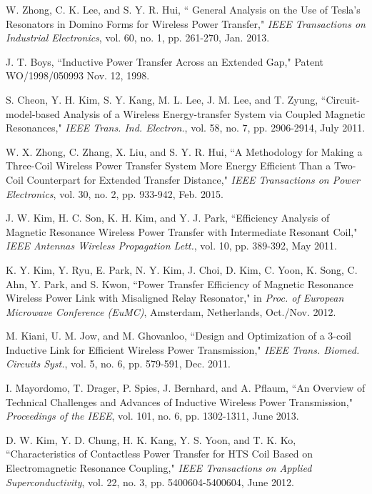 \documentclass[twocolumn,10pt]{IEEEtran}
\begin{document}
\begin{thebibliography}{99}
   W. Zhong, C. K. Lee, and S. Y. R. Hui, ``
 General Analysis on the Use of Tesla's Resonators in Domino Forms for Wireless Power Transfer," \emph{IEEE Transactions on Industrial Electronics}, vol. 60, no. 1, pp. 261-270, Jan. 2013.
 
 J. T. Boys, ``Inductive Power Transfer Across an Extended Gap," Patent WO/1998/050993 Nov. 12, 1998.
 
 S. Cheon, Y. H. Kim, S. Y. Kang, M. L. Lee, J. M. Lee, and T. Zyung, ``Circuit-model-based Analysis of a Wireless Energy-transfer System via Coupled Magnetic Resonances," \emph{IEEE Trans. Ind. Electron.}, vol. 58, no. 7, pp. 2906-2914, July 2011.
 
 W. X. Zhong, C. Zhang, X. Liu, and S. Y. R. Hui, 
``A Methodology for Making a Three-Coil Wireless Power Transfer System More Energy Efficient Than a Two-Coil Counterpart for Extended Transfer Distance,"
\emph{IEEE Transactions on Power Electronics}, 
vol. 30, no. 2, pp. 933-942, Feb. 2015. 

 J. W. Kim, H. C. Son, K. H. Kim, and Y. J. Park, ``Efficiency Analysis of Magnetic Resonance Wireless Power Transfer with Intermediate Resonant Coil," \emph{IEEE Antennas Wireless Propagation Lett.}, vol. 10, pp. 389-392,  May 2011. 
 
 K. Y. Kim, Y. Ryu, E. Park, N. Y. Kim, J. Choi, D. Kim, C. Yoon, K. Song, C. Ahn, Y. Park, and S. Kwon, ``Power Transfer Efficiency of Magnetic Resonance Wireless Power Link with Misaligned Relay Resonator," 
in \emph{Proc. of European Microwave Conference (EuMC)}, Amsterdam, Netherlands, Oct./Nov. 2012.

 M. Kiani, U. M. Jow, and M. Ghovanloo, ``Design and Optimization of a 3-coil Inductive Link for Efficient Wireless Power Transmission," \emph{IEEE Trans. Biomed. Circuits Syst.}, vol. 5, no. 6, pp. 579-591, Dec. 2011.


I. Mayordomo, T. Drager, P. Spies, J. Bernhard, and A. Pflaum, ``An Overview of Technical Challenges and Advances of Inductive Wireless Power Transmission," \emph{Proceedings of the IEEE}, vol. 101, no. 6, pp. 1302-1311, June 2013.

D. W. Kim, Y. D. Chung, H. K. Kang, Y. S. Yoon, and T. K. Ko, ``Characteristics of Contactless Power Transfer for HTS Coil Based on Electromagnetic Resonance Coupling," \emph{IEEE Transactions on Applied Superconductivity}, vol. 22, no. 3, pp.  5400604-5400604, June 2012.



\end{thebibliography}
\end{document}
